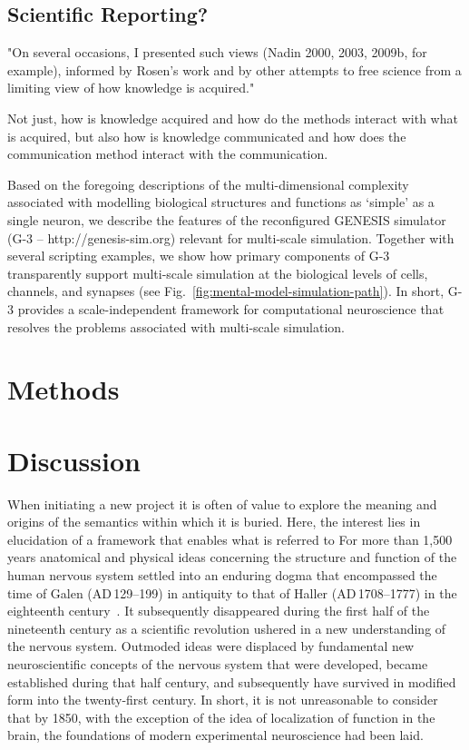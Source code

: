 \documentclass{article}
\begin{document}
\subsection{Scientific Reporting?}
"On several occasions, I presented such views (Nadin 2000, 2003, 2009b, for example), informed by Rosen’s work and by other attempts to free science from a limiting view of how knowledge is acquired."

Not just, how is knowledge acquired and how do the methods interact with what is acquired, but also how is knowledge communicated and how does the communication method interact with the communication.

\vspace*{1cm}

Based on the foregoing descriptions of the multi-dimensional complexity associated with modelling biological structures and functions as ‘simple’ as a single neuron, we describe the features of the reconfigured GENESIS simulator (G-3 -- http://genesis-sim.org) relevant for multi-scale simulation.  Together with several scripting examples, we show how primary components of G-3 transparently support multi-scale simulation at the biological levels of cells, channels, and synapses (see Fig.~\ref{fig:mental-model-simulation-path}). In short, G-3 provides a scale-independent framework for computational neuroscience that resolves the problems associated with multi-scale simulation.

\section{Methods}


\section{Discussion}

When initiating a new project it is often of value to explore the meaning and origins of the semantics within which it is buried. Here, the interest lies in elucidation of a framework that enables what is referred to  
For more than 1,500 years anatomical and physical ideas concerning the structure and function of the human nervous system settled into an enduring dogma that encompassed the time of Galen (\small{AD}\,129--199) in antiquity to that of Haller (\small{AD}\,1708--1777) in the eighteenth century~\cite{clarke87}. It subsequently disappeared during the first half of the nineteenth century as a scientific revolution ushered in a new understanding of the nervous system. Outmoded ideas were displaced by fundamental new neuroscientific concepts of the nervous system that were developed, became established during that half century, and subsequently have survived in modified form into the twenty-first century. In short, it is not unreasonable to consider that by 1850, with the exception of the idea of localization of function in the brain, the foundations of modern experimental neuroscience had been laid.
\end{document}
